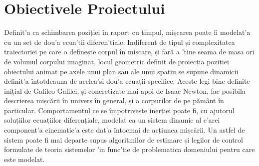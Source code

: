 \documentclass[12pt,a4paper,twoside]{report}
\begin{document}



\chapter{Obiectivele Proiectului}



Definit'a ca schimbarea poziției în raport cu timpul, mișcarea poate fi modelat'a cu un set de dou'a ecua'tii diferen'tiale. Indiferent de tipul și complexitatea traiectoriei pe care o definește corpul în mișcare, și fară a 'tine seama de masa ori de volumul corpului imaginat, locul geometric definit de proiecția poziției obiectului animat pe axele unui plan sau ale unui spatiu se supune dinamicii definit'a întotdeauna de acelea'si dou'a ecuații specifice. Aceste legi bine definite inițial de Galileo Galilei, și concretizate mai apoi de Isaac Newton, fac posibila descrierea mișcării în univers în general, și a corpurilor de pe pământ în particular. Comportamentul ce se împotrivește inerției poate fi, cu ajutorul soluțiilor ecuațiilor diferențiale, modelat ca un sistem dinamic al c'arei component'a cinematic'a este dat'a întocmai de acțiunea mișcării. Un astfel de sistem poate fi mai departe supus algoritmilor de estimare și legilor de control formulate de teoria sistemelor 'in func'tie de problematica domeniului pentru care este modelat. 
\end{document}
